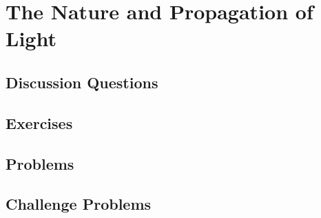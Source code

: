 
\chapter{The Nature and Propagation of Light}

\section{Discussion Questions}

\section{Exercises}

\section{Problems}

\section{Challenge Problems}
